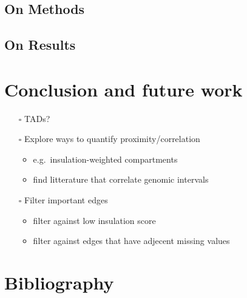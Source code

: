 \documentclass[
  11pt,
  a4paper,
]{scrbook}
\providecommand{\tightlist}{%
  \setlength{\itemsep}{0pt}\setlength{\parskip}{0pt}}\usepackage{longtable,booktabs,array}
\begin{document}
\section{On Methods}\label{on-methods}

\section{On Results}\label{on-results}

\chapter{Conclusion and future work}\label{conclusion-and-future-work}

\begin{itemize}
\tightlist
\item[$\square$]
  TADs?
\item[$\square$]
  Explore ways to quantify proximity/correlation

  \begin{itemize}
  \tightlist
  \item
    e.g.~insulation-weighted compartments
  \item
    find litterature that correlate genomic intervals
  \end{itemize}
\item[$\square$]
  Filter important edges

  \begin{itemize}
  \tightlist
  \item
    filter against low insulation score
  \item
    filter against edges that have adjecent missing values
  \end{itemize}
\end{itemize}

\chapter*{Bibliography}\label{bibliography}
\end{document}
